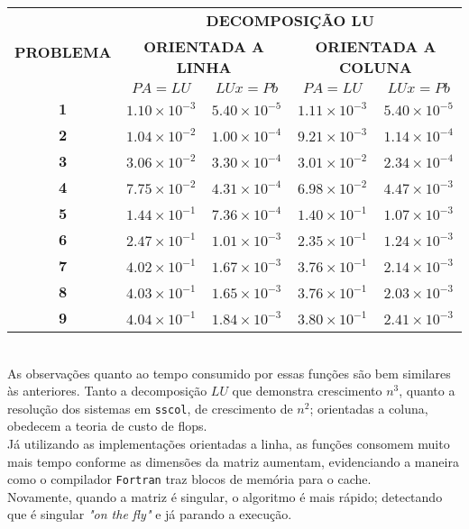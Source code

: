 \documentclass[a4paper,11pt]{article}
\newcommand\tab[1][.5cm]{\hspace*{#1}}
\begin{document}
\begin{table}[h]
\begin{tabular}{|c|c|c|c|c|}
\hline
\multirow{3}{*}{\textbf{PROBLEMA}} & \multicolumn{4}{c|}{\textbf{DECOMPOSIÇÃO LU}}                                             \\ \cline{2-5} 
                                   & \multicolumn{2}{c|}{\textbf{ORIENTADA A LINHA}} & \multicolumn{2}{c|}{\textbf{ORIENTADA A COLUNA}} \\ \cline{2-5} 
                                   & \textbf{$PA=LU$}         & \textbf{$LUx=Pb$}        & \textbf{$PA=LU$}         & \textbf{$LUx=Pb$}         \\ \hline
\textbf{1}                         & $1.10\times10^{-3}$ &  $5.40\times10^{-5}$  & $1.11\times10^{-3}$ &  $5.40\times10^{-5}$   \\ \hline
\textbf{2}                         & $1.04\times10^{-2}$ &  $1.00\times10^{-4}$  & $9.21\times10^{-3}$ &  $1.14\times10^{-4}$   \\ \hline
\textbf{3}                         & $3.06\times10^{-2}$ &  $3.30\times10^{-4}$  & $3.01\times10^{-2}$ &  $2.34\times10^{-4}$   \\ \hline
\textbf{4}                         & $7.75\times10^{-2}$ &  $4.31\times10^{-4}$  & $6.98\times10^{-2}$ &  $4.47\times10^{-3}$   \\ \hline
\textbf{5}                         & $1.44\times10^{-1}$ &  $7.36\times10^{-4}$  & $1.40\times10^{-1}$ &  $1.07\times10^{-3}$   \\ \hline
\textbf{6}                         & $2.47\times10^{-1}$ &  $1.01\times10^{-3}$  & $2.35\times10^{-1}$ &  $1.24\times10^{-3}$   \\ \hline
\textbf{7}                         & $4.02\times10^{-1}$ &  $1.67\times10^{-3}$  & $3.76\times10^{-1}$ &  $2.14\times10^{-3}$   \\ \hline
\textbf{8}                         & $4.03\times10^{-1}$ &  $1.65\times10^{-3}$  & $3.76\times10^{-1}$ &  $2.03\times10^{-3}$   \\ \hline
\textbf{9}                         & $4.04\times10^{-1}$ &  $1.84\times10^{-3}$  & $3.80\times10^{-1}$ &  $2.41\times10^{-3}$   \\ \hline
\end{tabular}
\end{table}
\\
As observações quanto ao tempo consumido por essas funções são bem similares às anteriores. Tanto a  decomposição $LU$ que demonstra crescimento $n^3$, quanto a resolução dos sistemas em \texttt{sscol}, de crescimento de $n^2$; orientadas a coluna, obedecem a teoria de custo de flops. \\
\tab Já utilizando as implementações orientadas a linha, as funções consomem muito mais tempo conforme as dimensões da matriz aumentam, evidenciando a maneira como o compilador \texttt{Fortran} traz blocos de memória para o cache. \\
\tab Novamente, quando a matriz é singular, o algoritmo é mais rápido; detectando que é singular \textit{"on the fly"} e já parando a execução. 
\end{document}
